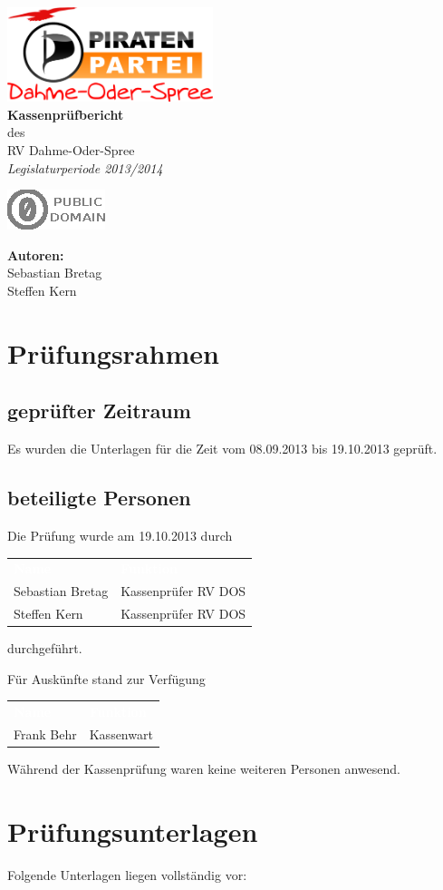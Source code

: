 \documentclass[%
	titlepage,oneside,12pt,headlines=1.5,numbers=noenddot, chapterprefix=false,parskip=full-,DIV=14,pagesize]{scrreprt}
\makeatletter
\newcommand*\@lizenz{
		\includegraphics[scale=2.5]{./pd.eps}
	}
\renewcommand\maketitle{
	\begingroup
		\begin{titlepage}
			\begin{center}
					\includegraphics[width=6cm]{DOS-Logo.png}\\[4cm]
				{\bfseries
					\makeatletter
						\Huge Kassenprüfbericht
					\makeatother
				}\\[5mm]
				\makeatletter
					{\Large des}\\[5mm]
					{\Large RV Dahme-Oder-Spree}\\[50mm]
					\textit{\Large Legislaturperiode 2013/2014 }
				\makeatother
					
			\end{center}
    		\vspace*{\fill} 
    		\begin{minipage}[b]{8cm}
    		\begin{flushleft}
    			\makeatletter
    				\@lizenz
    			\makeatother
    		\end{flushleft}
    	\end{minipage}
    		\hfill
    		\begin{minipage}[b]{8cm} 
    			\begin{flushright}
    				\textbf{Autoren:}\\[2mm]
    				Sebastian Bretag\\
    				Steffen Kern
    			\end{flushright}
    		\end{minipage}
    	\end{titlepage}
	\endgroup
	\pagebreak
	\pagestyle{plain}
	\onehalfspacing 
	\pagenumbering{arabic}
	\setcounter{page}{1}
	\tableofcontents
	\pagebreak
}
\renewcommand{\arraystretch}{1.2}%
\makeatother
\begin{document}
 
\maketitle

\chapter{Prüfungsrahmen}
\section{geprüfter Zeitraum}
Es wurden die Unterlagen für die Zeit vom 08.09.2013 bis 19.10.2013 geprüft.

\section{beteiligte Personen}
Die Prüfung wurde am 19.10.2013 durch
\renewcommand{\arraystretch}{1.2}%
\setlength{\arrayrulewidth}{1.5pt}%
%
\begin{longtable}[ht]{|p{} p{}|}
\hline\rowcolor{pirateorange} 
	\textcolor{white}{\textbf{Name}} & \textcolor{white}{\textbf{Funktion}}  \\
        Sebastian Bretag & Kassenprüfer RV DOS \\ 
        Steffen Kern  & Kassenprüfer RV DOS  \\
\hline
\end{longtable}\vspace{-1.25em}
durchgeführt.

Für Auskünfte stand zur Verfügung
\renewcommand{\arraystretch}{1.2}%
\setlength{\arrayrulewidth}{1.5pt}%
%
\begin{longtable}[ht]{|p{} p{}|}
\hline\rowcolor{pirateorange} 
	\textcolor{white}{\textbf{Name}} & \textcolor{white}{\textbf{Funktion}}  \\ 
        Frank Behr & Kassenwart \\\hline
\end{longtable}\vspace{-1.25em}


Während der Kassenprüfung waren keine weiteren Personen anwesend.


\chapter{Prüfungsunterlagen}
Folgende Unterlagen liegen vollständig vor:
\end{document}
